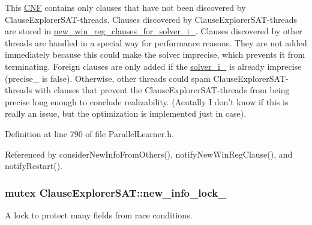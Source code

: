 This \hyperlink{classCNF}{C\-N\-F} contains only clauses that have not been discovered by Clause\-Explorer\-S\-A\-T-\/threads. Clauses discovered by Clause\-Explorer\-S\-A\-T-\/threads are stored in \hyperlink{classClauseExplorerSAT_a2c3e73b4c0529b9139354a965d34e81f}{new\-\_\-win\-\_\-reg\-\_\-clauses\-\_\-for\-\_\-solver\-\_\-i\-\_\-}. Clauses discovered by other threads are handled in a special way for performance reasons. They are not added immediately because this could make the solver imprecise, which prevents it from terminating. Foreign clauses are only added if the \hyperlink{classClauseExplorerSAT_a65b5b3d04ff5be8bfec60d3dcf86e4d0}{solver\-\_\-i\-\_\-} is already imprecise (precise\-\_\- is false). Otherwise, other threads could spam Clause\-Explorer\-S\-A\-T-\/threads with clauses that prevent the Clause\-Explorer\-S\-A\-T-\/threads from being precise long enough to conclude realizability. (Acutally I don't know if this is really an issue, but the optimization is implemented just in case). 

Definition at line 790 of file Parallel\-Learner.\-h.



Referenced by consider\-New\-Info\-From\-Others(), notify\-New\-Win\-Reg\-Clause(), and notify\-Restart().

\hypertarget{classClauseExplorerSAT_a674651f8fbf9ed93264ce3369bd5332b}{
\subsubsection[{new\-\_\-info\-\_\-lock\-\_\-}]{\setlength{\rightskip}{0pt plus 5cm}mutex Clause\-Explorer\-S\-A\-T\-::new\-\_\-info\-\_\-lock\-\_\-\hspace{0.3cm}{\ttfamily [protected]}}}\label{classClauseExplorerSAT_a674651f8fbf9ed93264ce3369bd5332b}


A lock to protect many fields from race conditions. 

